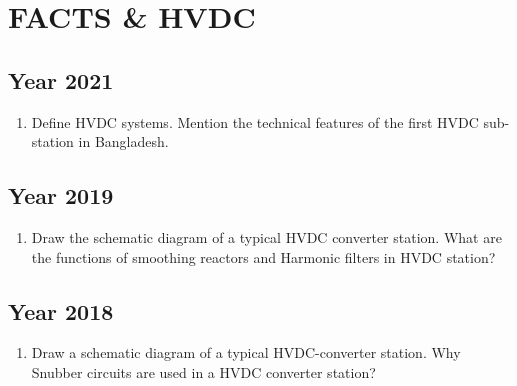 \documentclass[12pt, a4paper]{article}
\begin{document}
	\section{FACTS \& HVDC}
	
	\subsection{Year 2021}
	\begin{enumerate}[label=\textbf{Q8(a).}, wide, labelindent=0pt]
		\item Define HVDC systems. Mention the technical features of the first HVDC sub-station in Bangladesh.
	\end{enumerate}
	
	\subsection{Year 2019}
	\begin{enumerate}[label=\textbf{Q8(c).}, wide, labelindent=0pt]
		\item Draw the schematic diagram of a typical HVDC converter station. What are the functions of smoothing reactors and Harmonic filters in HVDC station?
	\end{enumerate}
	
	\subsection{Year 2018}
	\begin{enumerate}[label=\textbf{Q8(a).}, wide, labelindent=0pt]
		\item Draw a schematic diagram of a typical HVDC-converter station. Why Snubber circuits are used in a HVDC converter station?
	\end{enumerate}
\end{document}
